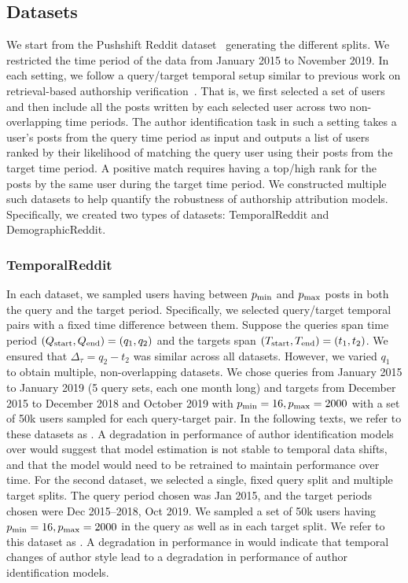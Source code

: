 \subsection{Datasets}
We start from the Pushshift Reddit dataset~\cite{baumgartner2020pushshift} generating the different splits. 
We restricted the time period of the data from January 2015 to November 2019.
In each setting, we follow a query/target temporal setup similar to previous work on retrieval-based authorship verification~\cite{andrews2019learning,khan2021deep}.
That is, we first selected a set of users and then include all the posts written by each selected user across two non-overlapping time periods.
The author identification task in such a setting takes a user's posts from the query time period as input and outputs a list of users ranked by their likelihood of matching the query user using their posts from the target time period.
A positive match requires having a top/high rank for the posts by the same user during the target time period.
We constructed multiple such datasets to help quantify the robustness of authorship attribution models.
Specifically, we created two types of datasets: TemporalReddit and DemographicReddit.

\subsubsection{TemporalReddit} 
In each dataset, we sampled users having between $p_{\rm{min}}$ and $p_{\rm{max}}$ posts in both the query and the target period. 
Specifically, we selected query/target temporal pairs with a fixed time difference between them.
Suppose the queries span time period $(Q_{\rm{start}}, Q_{\rm{end}}) = (q_1, q_2)$ and the targets span $(T_{\rm{start}}, T_{\rm{end}}) = (t_1, t_2)$.
We ensured that $\Delta_\tau = q_2 - t_2$ was similar across all datasets. 
However, we varied $q_1$ to obtain multiple, non-overlapping datasets.
We chose queries from January 2015 to January 2019 (5 query sets, each one month long) and targets from December 2015 to December 2018 and October 2019 with $p_{\rm{min}} = 16, p_{\rm{max}} = 2000$ with a set of 50k users sampled for each query-target pair.
In the following texts, we refer to these datasets as \DSfixeddelta{}.
A degradation in performance of author identification models over \DSfixeddelta{} would suggest that model estimation is not stable to temporal data shifts, and that the model would need to be retrained to maintain performance over time.
For the second dataset, we selected a single, fixed query split and multiple target splits. 
The query period chosen was Jan 2015, and the target periods chosen were Dec 2015--2018, Oct 2019. 
We sampled a set of 50k users having $p_{\rm{min}} = 16, p_{\rm{max}} = 2000$ in the query as well as in each target split.
We refer to this dataset as \DSvarydelta{}. 
A degradation in performance in \DSvarydelta{} would indicate that temporal changes of author style lead to a degradation in performance of author identification models.

